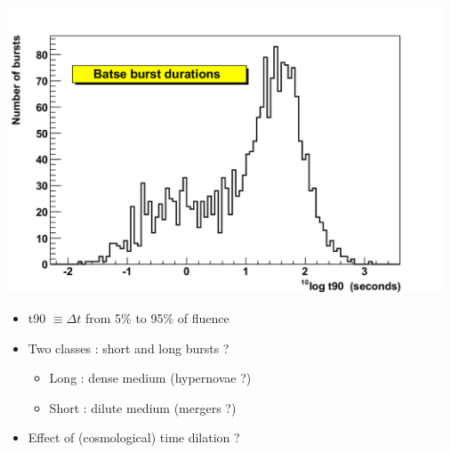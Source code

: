 \Tr
{}%
\vspace*{0.5cm}
%
\begin{center}
\includegraphics[keepaspectratio,width=13cm]{batse-logt90}
\end{center}

\newpage

\vspace*{1cm}
%
\begin{itemize}
\item t90 $\equiv \Delta t$ from 5\% to 95\% of fluence
\item Two classes : short and long bursts ?
\begin{itemize}
\item Long : dense medium (hypernovae ?)
\item Short : dilute medium (mergers ?)
\end{itemize}
\item[] {\blue Effect of (cosmological) time dilation ?}
\end{itemize}

